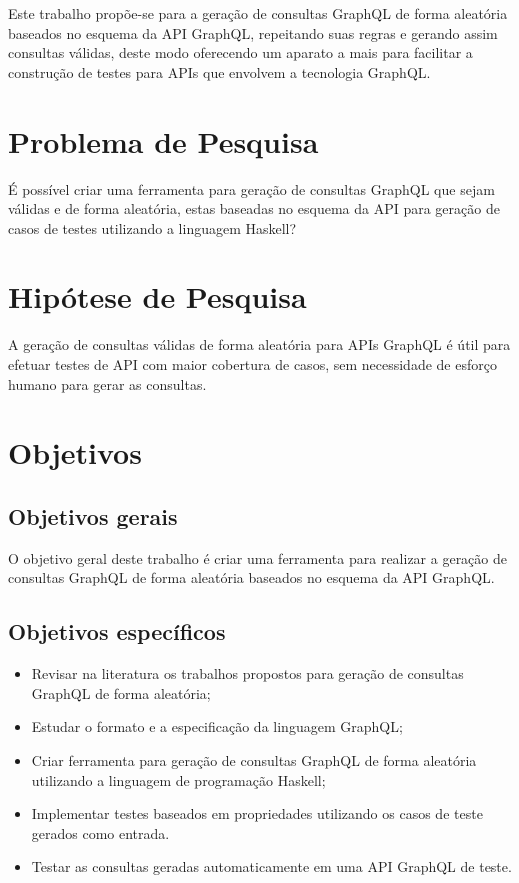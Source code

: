 Este trabalho propõe-se para a geração de consultas GraphQL de forma aleatória baseados no esquema da API GraphQL, repeitando suas regras e gerando assim consultas válidas, deste modo oferecendo um aparato a mais para facilitar a construção de testes para APIs que envolvem a tecnologia GraphQL.

\section{Problema de Pesquisa}
É possível criar uma ferramenta para geração de consultas GraphQL que sejam válidas e de forma aleatória, estas baseadas no esquema da API para geração de casos de testes utilizando a linguagem Haskell?

\section{Hipótese de Pesquisa}
A geração de consultas válidas de forma aleatória para APIs GraphQL é útil para efetuar testes de API com maior cobertura de casos, sem necessidade de esforço humano para gerar as consultas.

\section{Objetivos}
\subsection{Objetivos gerais}
O objetivo geral deste trabalho é criar uma ferramenta para realizar a geração de consultas GraphQL de forma aleatória baseados no esquema da API GraphQL.

\subsection{Objetivos específicos}
\begin{itemize}
\item Revisar na literatura os trabalhos propostos para geração de consultas GraphQL de forma aleatória;
\item Estudar o formato e a especificação da linguagem GraphQL;
\item Criar ferramenta para geração de consultas GraphQL de forma aleatória utilizando a linguagem de programação Haskell;
\item Implementar testes baseados em propriedades utilizando os casos de teste gerados como entrada.
\item Testar as consultas geradas automaticamente em uma API GraphQL de teste.
\end{itemize}

